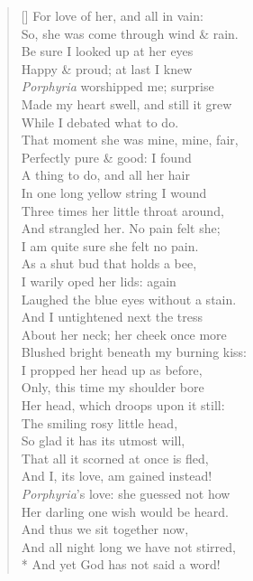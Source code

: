 \documentclass[MAIN]{subfiles}
\begin{document}
\begin{verse}[\versewidth]
\vin For love of her, and all in vain:\\
\vin So, she was come through wind \& rain.\\
Be sure I looked up at her eyes\\
\vin Happy \& proud; at last I knew\\
\emph{Porphyria} worshipped me; surprise\\
\vin Made my heart swell, and still it grew\\
\vin While I debated what to do.\\
That moment she was mine, mine, fair,\\
\vin Perfectly pure \& good: I found\\
A thing to do, and all her hair\\
\vin In one long yellow string I wound\\
\vin Three times her little throat around,\\
And strangled her. No pain felt she;\\
\vin I am quite sure she felt no pain.\\
As a shut bud that holds a bee,\\
\vin I warily oped her lids: again\\
\vin Laughed the blue eyes without a stain.\\
And I untightened next the tress\\
\vin About her neck; her cheek once more\\
Blushed bright beneath my burning kiss:\\
\vin I propped her head up as before,\\
\vin Only, this time my shoulder bore\\
Her head, which droops upon it still:\\
\vin The smiling rosy little head,\\
So glad it has its utmost will,\\
\vin That all it scorned at once is fled,\\
\vin And I, its love, am gained instead!\\
\emph{Porphyria}'s love: she guessed not how\\
\vin Her darling one wish would be heard.\\
And thus we sit together now,\\
\vin And all night long we have not stirred,\\*
\vin And yet God has not said a word!
\end{verse}
\end{document}
